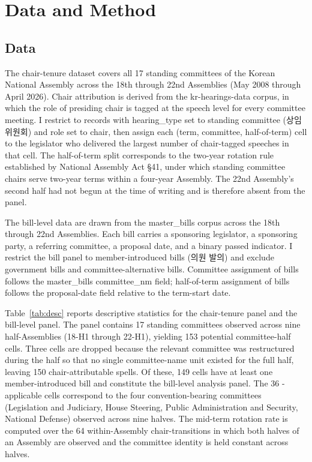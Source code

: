\documentclass[11pt]{article}
\begin{document}
\section{Data and Method}

\subsection{Data}

The chair-tenure dataset covers all 17 standing committees of the Korean National Assembly across the 18th through 22nd Assemblies (May 2008 through April 2026). Chair attribution is derived from the kr-hearings-data corpus, in which the role of presiding chair is tagged at the speech level for every committee meeting. I restrict to records with hearing\_type set to standing committee (상임위원회) and role set to chair, then assign each (term, committee, half-of-term) cell to the legislator who delivered the largest number of chair-tagged speeches in that cell. The half-of-term split corresponds to the two-year rotation rule established by National Assembly Act §41, under which standing committee chairs serve two-year terms within a four-year Assembly. The 22nd Assembly's second half had not begun at the time of writing and is therefore absent from the panel.

The bill-level data are drawn from the master\_bills corpus across the 18th through 22nd Assemblies. Each bill carries a sponsoring legislator, a sponsoring party, a referring committee, a proposal date, and a binary passed indicator. I restrict the bill panel to member-introduced bills (의원 발의) and exclude government bills and committee-alternative bills. Committee assignment of bills follows the master\_bills committee\_nm field; half-of-term assignment of bills follows the proposal-date field relative to the term-start date.

Table~\ref{tab:desc} reports descriptive statistics for the chair-tenure panel and the bill-level panel. The panel contains 17 standing committees observed across nine half-Assemblies (18-H1 through 22-H1), yielding 153 potential committee-half cells. Three cells are dropped because the relevant committee was restructured during the half so that no single committee-name unit existed for the full half, leaving 150 chair-attributable spells. Of these, 149 cells have at least one member-introduced bill and constitute the bill-level analysis panel. The 36 \citet{jung2018}-applicable cells correspond to the four convention-bearing committees (Legislation and Judiciary, House Steering, Public Administration and Security, National Defense) observed across nine halves. The mid-term rotation rate is computed over the 64 within-Assembly chair-transitions in which both halves of an Assembly are observed and the committee identity is held constant across halves.
\end{document}
